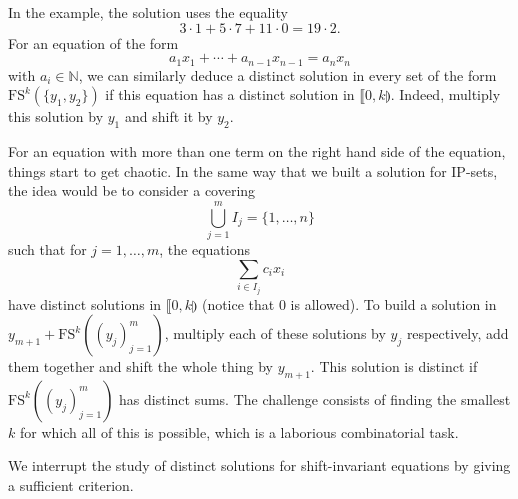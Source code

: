 \documentclass{article}
\theoremstyle{definition}
\theoremstyle{plain}
\theoremstyle{remark}
\newcommand{\N}{\ensuremath{\mathbb{N}}}
\newcommand{\FS}[2][]{\ensuremath{\mathrm{FS}^{#1}\left(#2\right)}}
\begin{document}
In the example, the solution uses the equality
$$3\cdot 1 + 5 \cdot 7 + 11\cdot 0 = 19 \cdot 2.$$
For an equation of the form
$$a_1 x_1 + \cdots + a_{n-1} x_{n-1} = a_n x_n$$
with $a_i \in \N$, we can similarly deduce a distinct solution in every set of the form $\FS[k]{\{y_1,y_2\}}$ if this equation has a distinct solution in $\llbracket 0,k \rrparenthesis$. Indeed, multiply this solution by $y_1$ and shift it by $y_2$.

For an equation with more than one term on the right hand side of the equation, things start to get chaotic. In the same way that we built a solution for IP-sets, the idea would be to consider a covering
$$\bigcup_{j=1}^m I_j = \{1,\ldots,n\}$$
such that for $j=1,\ldots,m$, the equations
$$\sum_{i\in I_j} c_i x_i$$
have distinct solutions in $\llbracket 0,k \rrparenthesis$ (notice that 0 is allowed). To build a solution in $y_{m+1} + \FS[k]{(y_j)_{j=1}^m}$, multiply each of these solutions by $y_j$ respectively, add them together and shift the whole thing by $y_{m+1}$. This solution is distinct if $\FS[k]{(y_j)_{j=1}^m}$ has distinct sums. The challenge consists of finding the smallest $k$ for which all of this is possible, which is a laborious combinatorial task.

We interrupt the study of distinct solutions for shift-invariant equations by giving a sufficient criterion.
\end{document}
